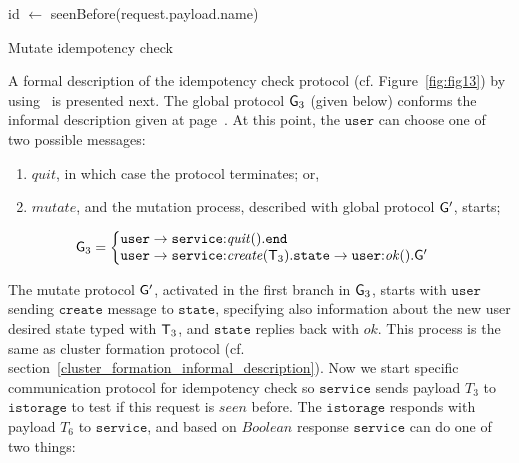 \begin{algorithm}[H]
	
	\SetAlgoLined
	id $\leftarrow$ seenBefore(request.payload.name)\\
	\caption{Mutate idempotency check}
	\label{alg:alg6}
\end{algorithm}

\noindent
A formal description of the idempotency check protocol (cf. Figure~\ref{fig:fig13}) by using~\cite{HuY17} is presented next. The global protocol ${\sf G}_3$ (given below) conforms the informal description given at page~\pageref{informal_description_idempotency}. At this point, the $\mathtt{user}$ can choose one of two possible messages: 

\begin{enumerate}[start=1,label={(\bfseries \arabic*)}]
\item $\mathit{quit}$, in which case the protocol terminates; or, 
\item $\mathit{mutate}$, and the mutation process, described with global protocol ${\sf G}'$, starts;
\end{enumerate}
\begin{align*}
\G_3 & = 
\left\{
\begin{array}{@{}l@{}}  
\mathtt{user}\to\mathtt{service}{:} \mathit{quit}().\tend\\
\mathtt{user} \to \mathtt{service}{:}\mathit{create}(\T_3).
\mathtt{state} \to \mathtt{user}{:}\mathit{ok}().\G'
\end{array} \right.
\end{align*}

The mutate protocol ${\sf G}'$, activated in the first branch in ${\sf G}_3$, starts with $\mathtt{user}$ sending 
$\mathtt{create}$ message to $\mathtt{state}$, specifying also information about the new user desired state typed with ${\mathsf T}_3$, 
and $\mathtt{state}$ replies back with $\mathit{ok}$. This process is the same as cluster formation protocol (cf. section~\ref{cluster_formation_informal_description}). Now we start specific communication protocol for idempotency check so $\mathtt{service}$ sends payload $T_3$ to $\mathtt{istorage}$ to test if this request is $seen$ before. The $\mathtt{istorage}$ responds with payload $T_6$ to $\mathtt{service}$, and based on $Boolean$ response $\mathtt{service}$ can do one of two things:

